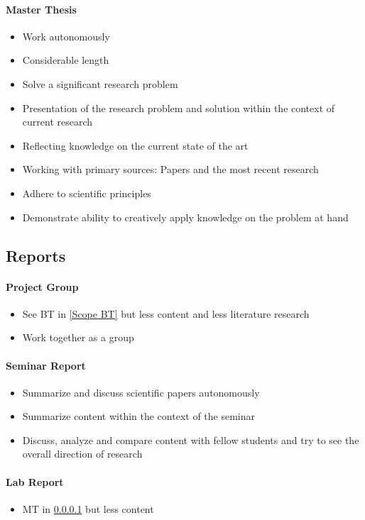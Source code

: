\documentclass[nodate]{proc}
\begin{document}
\paragraph{Master Thesis} \label{Scope MT}
\begin{itemize}
	\item Work autonomously
	\item Considerable length
	\item Solve a significant research problem
	\item Presentation of the research problem and solution within the context of current research
	\item Reflecting knowledge on the current state of the art
	\item Working with primary sources: Papers and the most recent research
	\item Adhere to scientific principles
	\item Demonstrate ability to creatively apply knowledge on the problem at hand
\end{itemize}

\subsection{Reports}

\paragraph{Project Group}
	\begin{itemize}
		\item See BT in \ref{Scope BT} but less content and less literature research
		\item Work together as a group
	\end{itemize}
\paragraph{Seminar Report}
	\begin{itemize}
		\item Summarize and discuss scientific papers autonomously
		\item Summarize content within the context of the seminar
		\item Discuss, analyze and compare content with fellow students and try to see the overall direction of research
	\end{itemize}
\paragraph{Lab Report}
	\begin{itemize}
		\item  MT in \ref{Scope MT} but less content
	\end{itemize}
\end{document}
